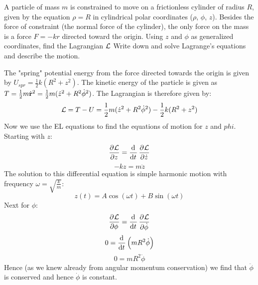 \documentclass[../PHYS306Notes.tex]{subfiles}
\begin{document}
\begin{p}
A particle of mass $m$ is constrained to move on a frictionless  cylinder of radius $R$, given by the equation $\rho = R$ in cylindrical polar coordinates ($\rho$, $\phi$, $z$). Besides the force of constraint (the normal force of the cylinder), the only force on the mass is a force $F = -kr$ directed toward the origin. Using $z$ and $\phi$ as generalized coordinates, find the Lagrangian $\mathcal{L}$ Write down and solve Lagrange's equations and describe the motion. 
\end{p}
\begin{s}
The "spring" potential energy from the force directed towards the origin is given by $U_{spr} = \frac{1}{2}k(R^2 + z^2)$. The kinetic energy of the particle is given as $T = \frac{1}{2}m\dot{\mathbf{r}}^2 = \frac{1}{2}m(\dot{z}^2 + R^2\dot{\phi}^2)$. The Lagrangian is therefore given by:
\[\mathcal{L} = T - U = \frac{1}{2}m(\dot{z}^2 + R^2\dot{\phi}^2) - \frac{1}{2}k(R^2 + z^2)\]
Now we use the EL equations to find the equations of motion for $z$ and $phi$. Starting with $z$:
\[\dpd{\LL}{z} = \dod{}{t}\dpd{\LL}{\dot{z}}\]
\[- kz = m\ddot{z}\]
The solution to this differential equation is simple harmonic motion with frequency $\omega = \sqrt{\frac{k}{m}}$:
\[z(t) = A\cos(\omega t) + B\sin(\omega t)\]
Next for $\phi$:
\[\dpd{\LL}{\phi} = \dod{}{t}\dpd{\LL}{\dot{\phi}}\]
\[0 = \dod{}{t}\left(mR^2\dot{\phi}\right)\]
\[0 = mR^2\ddot{\phi}\]
Hence (as we knew already from angular momentum conservation) we find that $\ddot{\phi}$ is conserved and hence $\dot{\phi}$ is constant. 
\end{s}
\end{document}
